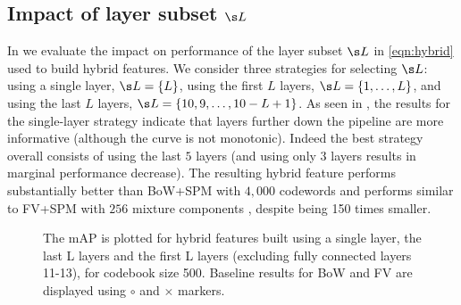 \documentclass{article}
\begin{document}
\subsection{Impact of layer subset $\s L$}
\label{sec:cases}
In  we evaluate the impact on performance of the layer subset $\s L$ in \eqref{eqn:hybrid} used to build hybrid features. We consider three strategies for selecting $\s L$: using a single layer, $\s L=\{L\}$, using the first $L$ layers, $\s L=\{1,\ldots,L\}$, and using the last $L$ layers, $\s L=\{10,9,\ldots,10-L+1\}$. As seen in , the results for the single-layer strategy indicate that layers further down the pipeline are more informative (although the curve is not monotonic). Indeed the best strategy overall consists of using the last $5$ layers (and using only $3$ layers results in marginal performance decrease). The resulting hybrid feature performs substantially better than BoW+SPM with $4,000$ codewords and performs similar to FV+SPM with $256$ mixture components \cite{perronnin}, despite being 150 times smaller. 


\begin{figure}[!ht]

\caption{The mAP is plotted for hybrid features built using a single layer, the last L layers and the first L layers (excluding fully connected layers 11-13), for codebook size 500. Baseline results for BoW and FV are displayed using $\circ$ and $\times$ markers.}
\label{fig:layer}

\end{figure}
\end{document}
